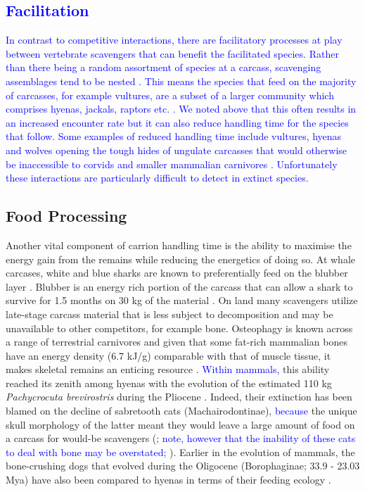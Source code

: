 \documentclass[a4paper,12pt]{article}
\begin{document}
\textcolor{blue}{\subsection{Facilitation}
In contrast to competitive interactions, there are facilitatory processes at play between vertebrate scavengers that can benefit the facilitated species. 
Rather than there being a random assortment of species at a carcass, scavenging assemblages tend to be nested \citep{selva2007nested}. 
This means the species that feed on the majority of carcasses, for example vultures, are a subset of a larger community which comprises hyenas, jackals, raptors etc. \citep{sebastian2016nested}. 
We noted above that this often results in an increased encounter rate but it can also reduce handling time for the species that follow. 
Some examples of reduced handling time include vultures, hyenas and wolves opening the tough hides of ungulate carcasses that would otherwise be inaccessible to corvids and smaller mammalian carnivores \citep{selva2003scavenging,moleon2015carcass}. 
Unfortunately these interactions are particularly difficult to detect in extinct species.}



\subsection{Food Processing}
Another vital component of carrion handling time is the ability to maximise the energy gain from the remains while reducing the energetics of doing so. 
At whale carcases, white and blue sharks are known to preferentially feed on the blubber layer \citep{long1996sharks}. 
Blubber is an energy rich portion of the carcass that can allow a shark to survive for 1.5 months on 30 kg of the material \citep{carey1982temperature}. 
On land many scavengers utilize late-stage carcass material that is less subject to decomposition and may be unavailable to other competitors, for example bone.
Osteophagy is known across a range of terrestrial carnivores and given that some fat-rich mammalian bones have an energy density (6.7 kJ/g) comparable with that of muscle tissue, it makes skeletal remains an enticing resource \citep{brown1989study}.
\textcolor{blue}{Within mammals,} this ability reached its zenith among hyenas with the evolution of the estimated 110 kg \textit{Pachycrocuta brevirostris} during the Pliocene \citep[3.6 - 2.58 Mya; ][]{palmqvist2011giant}.
Indeed, their extinction has been blamed on the decline of sabretooth cats (Machairodontinae), \textcolor{blue}{because} the unique skull morphology of the latter meant they would leave a large amount of food on a carcass for would-be scavengers (\citealt{palmqvist2011giant}; \textcolor{blue}{note, however that the inability of these cats to deal with bone may be overstated; \citealt{binder2010comparison}}). 
Earlier in the evolution of mammals, the bone-crushing dogs that evolved during the Oligocene (Borophaginae; 33.9 - 23.03 Mya) have also been compared to hyenas in terms of their feeding ecology \citep{van2003chapter,martin2016pursuit}.
\end{document}
